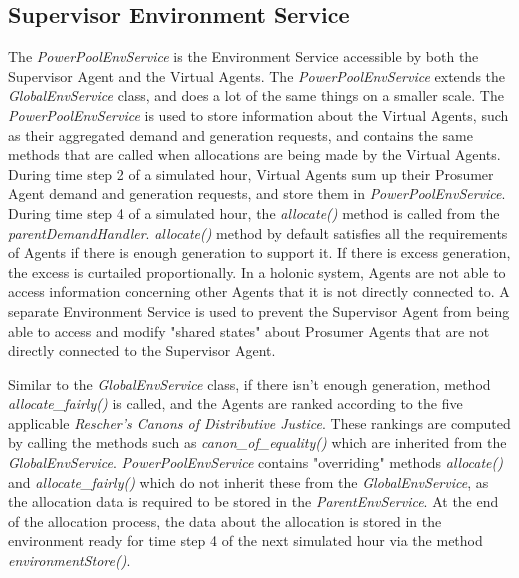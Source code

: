 \subsection*{Supervisor Environment Service}
The \textit{PowerPoolEnvService} is the Environment Service accessible by both the Supervisor Agent and the Virtual Agents. The \textit{PowerPoolEnvService} extends the \textit{GlobalEnvService} class, and does a lot of the same things on a smaller scale. The \textit{PowerPoolEnvService} is used to store information about the Virtual Agents, such as their aggregated demand and generation requests, and contains the same methods that are called when allocations are being made by the Virtual Agents. During time step 2 of a simulated hour, Virtual Agents sum up their Prosumer Agent demand and generation requests, and store them in \textit{PowerPoolEnvService}. During time step 4 of a simulated hour, the \textit{allocate()} method is called from the \textit{parentDemandHandler}. \textit{allocate()} method by default satisfies all the requirements of Agents if there is enough generation to support it. If there is excess generation, the excess is curtailed proportionally. In a holonic system, Agents are not able to access information concerning other Agents that it is not directly connected to. A separate Environment Service is used to prevent the Supervisor Agent from being able to access and modify "shared states" about Prosumer Agents that are not directly connected to the Supervisor Agent.

Similar to the \textit{GlobalEnvService} class, if there isn't enough generation, method \textit{allocate\_fairly()} is called, and the Agents are ranked according to the five applicable \textit{Rescher's Canons of Distributive Justice}. These rankings are computed by calling the methods such as \textit{canon\_of\_equality()} which are inherited from the \textit{GlobalEnvService}. \textit{PowerPoolEnvService} contains "overriding" methods \textit{allocate()} and \textit{allocate\_fairly()} which do not inherit these from the \textit{GlobalEnvService}, as the allocation data is required to be stored in the \textit{ParentEnvService}. At the end of the allocation process, the data about the allocation is stored in the environment ready for time step 4 of the next simulated hour via the method \textit{environmentStore()}.

